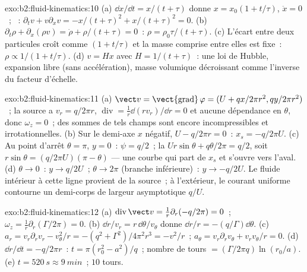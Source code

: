 \begin{solution}{exo:b2:fluid-kinematics:10}
(a) $\dd x/\dd t = x/(t + \tau)$ donne $x = x_0(1 + t/\tau)$, $\ddot x = 0$~;
~: $\partial_tv + v\partial_xv = -x/(t + \tau)^2 + x/(t + \tau)^2
= 0$. (b) $\partial_t\rho + \partial_x(\rho v) = \dot\rho + \rho/(t + \tau) = 0$~: $\rho =
\rho_0\tau/(t + \tau)$. (c) L'écart entre deux particules croît comme $(1 + t/\tau)$
et la masse comprise entre elles est fixe~: $\rho \propto 1/(1 + t/\tau)$. (d) $v =
Hx$ avec $H = 1/(t + \tau)$~: une loi de Hubble, expansion libre (sans
accélération), masse volumique décroissant comme l'inverse du facteur d'échelle.
\end{solution}

\begin{solution}{exo:b2:fluid-kinematics:11}
(a) $\vect v = \operatorname{\vect{grad}}\varphi = (U + qx/2\pi r^2, qy/2\pi r^2)$~;
la source a $v_r = q/2\pi r$, $\operatorname{div} = \frac1r\dd(rv_r)/\dd r
= 0$ et aucune dépendance en $\theta$, donc $\omega_z = 0$~; des sommes de tels champs sont
encore incompressibles et irrotationnelles. (b) Sur le demi-axe $x$ négatif,
$U - q/2\pi r = 0$~: $x_s = -q/2\pi U$. (c) Au point d'arrêt $\theta =
\pi$, $y = 0$~: $\psi = q/2$~; la  $Ur\sin\theta + q\theta/2\pi = q/2$,
soit $r\sin\theta = (q/2\pi U)(\pi - \theta)$ --- une courbe qui part de $x_s$ et
s'ouvre vers l'aval. (d) $\theta \to 0$~: $y \to q/2U$~; $\theta \to 2\pi$ (branche
inférieure)~: $y \to -q/2U$. Le fluide intérieur à cette ligne provient de la
source~; à l'extérieur, le courant uniforme contourne un demi-corps de
largeur asymptotique $q/U$.
\end{solution}

\begin{solution}{exo:b2:fluid-kinematics:12}
(a) $\operatorname{div}\vect v = \frac1r\partial_r(-q/2\pi) = 0$~; $\omega_z =
\frac1r\partial_r(\Gamma/2\pi) = 0$. (b) $\dd r/v_r = r\,\dd\theta/v_\theta$ donne
$\dd r/r = -(q/\Gamma)\dd\theta$. (c) $a_r = v_r\partial_rv_r - v_\theta^2/r =
-(q^2 + \Gamma^2)/4\pi^2r^3 = -v^2/r$~; $a_\theta = v_r\partial_rv_\theta + v_rv_\theta/r
= 0$. (d) $\dd r/\dd t = -q/2\pi r$~: $t = \pi(r_0^2 - a^2)/q$~; nombre de tours
$= (\Gamma/2\pi q)\ln(r_0/a)$. (e) $t = \qty{520}{s} \approx \qty{9}{min}$~; $10$
tours.
\end{solution}

